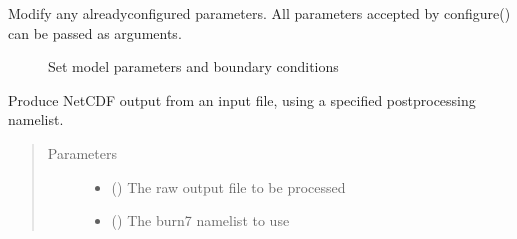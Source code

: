 \documentclass[letterpaper,10pt,english]{sphinxmanual}
\begin{document}
\begin{fulllineitems}
\begin{fulllineitems}
\begin{description}
\end{description}



\end{fulllineitems}


\begin{fulllineitems}
\label{\detokenize{source/exoplasim:exoplasim.Model.modify}}
Modify any already\sphinxhyphen{}configured parameters. All parameters accepted by configure() can be passed as arguments.



\begin{description}
\item[{{\hyperref[\detokenize{source/exoplasim:exoplasim.Model.configure}]{}}}] \leavevmode
Set model parameters and boundary conditions

\end{description}



\end{fulllineitems}


\begin{fulllineitems}
\label{\detokenize{source/exoplasim:exoplasim.Model.postprocess}}
Produce NetCDF output from an input file, using a specified postprocessing namelist.
\begin{quote}\begin{description}
\item[{Parameters}] \leavevmode\begin{itemize}
\item {} 
 () \textendash{} The raw output file to be processed

\item {} 
 () \textendash{} The burn7 namelist to use


\end{itemize}
\end{description}
\end{quote}
\end{fulllineitems}
\end{fulllineitems}
\end{document}
